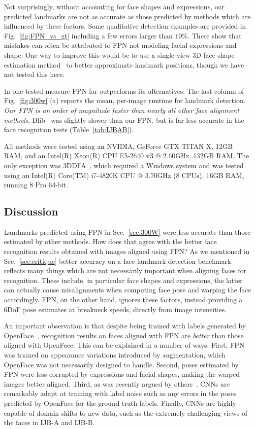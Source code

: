\documentclass[10pt,twocolumn,letterpaper]{article}
\newcommand{\minisection}[1]{\vspace{1mm}\noindent{\bf #1}}
\begin{document}
Not surprisingly, without accounting for face shapes and expressions, our predicted landmarks are not as accurate as those predicted by methods which are influenced by these factors. Some qualitative detection examples are provided in Fig.~\ref{fig:FPN_vs_gt} including a few errors larger than $10\%$. These show that mistakes can often be attributed to FPN not modeling facial expressions and shape. One way to improve this would be to use a single-view 3D face shape estimation method~\cite{hassner2013single,tran16_3dmm_cnn} to better approximate landmark positions, though we have not tested this here. 

\minisection{Detection runtime.} In one tested measure FPN far outperforms its alternatives: The last column of Fig.~\ref{fig:300w} (a) reports the mean, per-image runtime for landmark detection. {\em Our FPN is an order of magnitude faster than nearly all other face alignment methods}. Dlib~\cite{king2009dlib} was slightly slower than our FPN, but is far less accurate in the face recognition tests (Table~\ref{tab:IJBAB}). 

All methods were tested using an NVIDIA, GeForce GTX TITAN X, 12GB RAM, and an Intel(R) Xeon(R) CPU E5-2640 v3 @ 2.60GHz, 132GB RAM. The only exception was 3DDFA~\cite{zhu2015}, which required a Windows system and was tested using an Intel(R) Core(TM) i7-4820K CPU @ 3.70GHz (8 CPUs), 16GB RAM, running 8 Pro 64-bit.

\subsection{Discussion}
Landmarks predicted using FPN in Sec.~\ref{sec:300W} were less accurate than those estimated by other methods. How does that agree with the better face recognition results obtained with images aligned using FPN? As we mentioned in Sec.~\ref{sec:critique} better accuracy on a face landmark detection benchmark reflects many things which are not necessarily important when aligning faces for recognition. These include, in particular face shapes and expressions, the latter can actually cause misalignments when computing face pose and warping the face accordingly. FPN, on the other hand, ignores these factors, instead providing a 6DoF pose estimates at breakneck speeds, directly from image intensities. 

An important observation is that despite being trained with labels generated by OpenFace~\cite{baltruvsaitis2016openface}, recognition results on faces aligned with FPN are {\em better} than those aligned with OpenFace. This can be explained in a number of ways: First, FPN was trained on appearance variations introduced by augmentation, which OpenFace was not necessarily designed to handle. Second, poses estimated by FPN were less corrupted by expressions and facial shapes, making the warped images better aligned. Third, as was recently argued by others~\cite{tran16_3dmm_cnn}, CNNs are remarkably adapt at training with label noise such as any errors in the poses predicted by OpenFace for the ground truth labels. Finally, CNNs are highly capable of domain shifts to new data, such as the extremely challenging views of the faces in IJB-A and IJB-B. 
\end{document}
